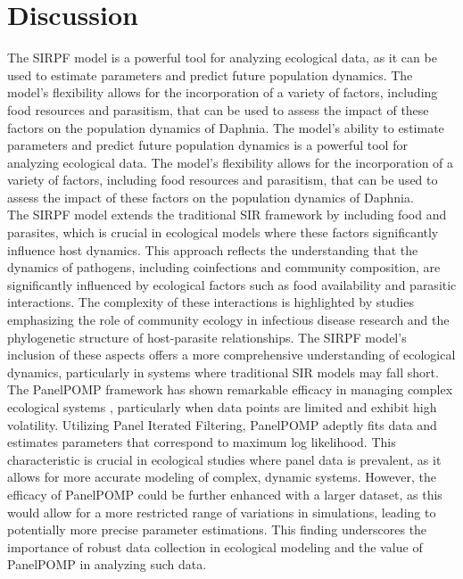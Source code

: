 \documentclass[12pt]{article}
\begin{document}
\section{Discussion}
\label{sec:dis}

The SIRPF model is a powerful tool for analyzing ecological data, as it can be used to estimate parameters and predict future population dynamics. The model's flexibility allows for the incorporation of a variety of factors, including food resources and parasitism, that can be used to assess the impact of these factors on the population dynamics of Daphnia. The model's ability to estimate parameters and predict future population dynamics is a powerful tool for analyzing ecological data. The model's flexibility allows for the incorporation of a variety of factors, including food resources and parasitism, that can be used to assess the impact of these factors on the population dynamics of Daphnia.\\

The SIRPF model extends the traditional SIR framework by including food and parasites, which is crucial in ecological models where these factors significantly influence host dynamics. This approach reflects the understanding that the dynamics of pathogens, including coinfections and community composition, are significantly influenced by ecological factors such as food availability and parasitic interactions. The complexity of these interactions is highlighted by studies emphasizing the role of community ecology in infectious disease research and the phylogenetic structure of host-parasite relationships. The SIRPF model's inclusion of these aspects offers a more comprehensive understanding of ecological dynamics, particularly in systems where traditional SIR models may fall short.\\

The PanelPOMP framework has shown remarkable efficacy in managing complex ecological systems \citep{Carles2020}, particularly when data points are limited and exhibit high volatility. Utilizing Panel Iterated Filtering, PanelPOMP adeptly fits data and estimates parameters that correspond to maximum log likelihood. This characteristic is crucial in ecological studies where panel data is prevalent, as it allows for more accurate modeling of complex, dynamic systems. However, the efficacy of PanelPOMP could be further enhanced with a larger dataset, as this would allow for a more restricted range of variations in simulations, leading to potentially more precise parameter estimations. This finding underscores the importance of robust data collection in ecological modeling and the value of PanelPOMP in analyzing such data.\\
\end{document}
